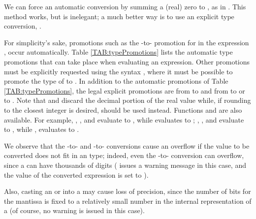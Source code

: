 We can force an automatic conversion by summing a (real) zero to
, as in .  This method works, but is inelegant;
a much better way is to use an explicit type conversion, .

For simplicity's sake, promotions such as the -to-
promotion for  in the expression , occur automatically.
Table \ref{TAB:typePromotions} lists the automatic
type promotions that can take place when evaluating an expression.
Other promotions must be explicitly requested
using the syntax , where it must be possible
to promote the type of  to .
In addition to the automatic promotions of Table \ref{TAB:typePromotions},
the legal explicit promotions are
from  to  and from  to 
or to .
Note that  and  discard the decimal portion of
the real value  while, if rounding to the closest integer is desired,
 should be used instead.
Functions  and  are also available.
For example,
,
, and
 evaluate to , while
 evaluates to ;
,
,
and 
evaluate to , while
, evaluates to .





We observe that the -to- and -to-
conversions cause an overflow if the value to be converted does not fit
in an  type;
indeed, even the -to- conversion can overflow,
since a  can have thousands of digits 
({\smart} issues a warning message in this case, and the value of
the converted expression is set to ).

Also, casting an  or  into a 
may cause loss of precision, since the number of bits for the mantissa
is fixed to a relatively small number in the internal representation
of a  (of course, no warning is issued in this case).

